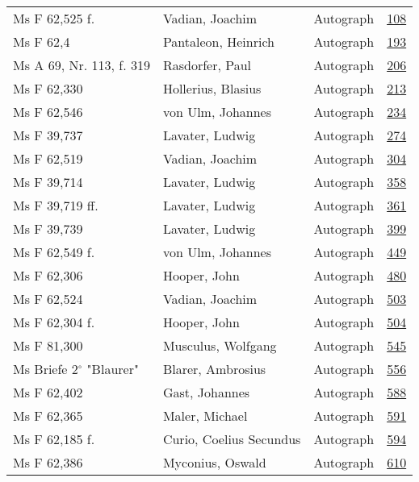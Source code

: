 \documentclass[10pt,a4paper,landscape]{report}
\begin{document}
\begin{longtable}{p{16cm}p{4cm}lr}
Ms F 62,525 f.	&	Vadian, Joachim	&	Autograph	&	\href{http://130.60.24.72/assignment/108}{108}\\
Ms F 62,4	&	Pantaleon, Heinrich	&	Autograph	&	\href{http://130.60.24.72/assignment/193}{193}\\
Ms A 69, Nr. 113, f. 319	&	Rasdorfer, Paul	&	Autograph	&	\href{http://130.60.24.72/assignment/206}{206}\\
Ms F 62,330	&	Hollerius, Blasius	&	Autograph	&	\href{http://130.60.24.72/assignment/213}{213}\\
Ms F 62,546	&	von Ulm, Johannes	&	Autograph	&	\href{http://130.60.24.72/assignment/234}{234}\\
Ms F 39,737	&	Lavater, Ludwig	&	Autograph	&	\href{http://130.60.24.72/assignment/274}{274}\\
Ms F 62,519	&	Vadian, Joachim	&	Autograph	&	\href{http://130.60.24.72/assignment/304}{304}\\
Ms F 39,714	&	Lavater, Ludwig	&	Autograph	&	\href{http://130.60.24.72/assignment/358}{358}\\
Ms F 39,719 ff.	&	Lavater, Ludwig	&	Autograph	&	\href{http://130.60.24.72/assignment/361}{361}\\
Ms F 39,739	&	Lavater, Ludwig	&	Autograph	&	\href{http://130.60.24.72/assignment/399}{399}\\
Ms F 62,549 f.	&	von Ulm, Johannes	&	Autograph	&	\href{http://130.60.24.72/assignment/449}{449}\\
Ms F 62,306	&	Hooper, John	&	Autograph	&	\href{http://130.60.24.72/assignment/480}{480}\\
Ms F 62,524	&	Vadian, Joachim	&	Autograph	&	\href{http://130.60.24.72/assignment/503}{503}\\
Ms F 62,304 f.	&	Hooper, John	&	Autograph	&	\href{http://130.60.24.72/assignment/504}{504}\\
Ms F 81,300	&	Musculus, Wolfgang	&	Autograph	&	\href{http://130.60.24.72/assignment/545}{545}\\
Ms Briefe 2$^\circ$ "Blaurer"	&	Blarer, Ambrosius	&	Autograph	&	\href{http://130.60.24.72/assignment/556}{556}\\
Ms F 62,402	&	Gast, Johannes	&	Autograph	&	\href{http://130.60.24.72/assignment/588}{588}\\
Ms F 62,365	&	Maler, Michael	&	Autograph	&	\href{http://130.60.24.72/assignment/591}{591}\\
Ms F 62,185 f.	&	Curio, Coelius Secundus	&	Autograph	&	\href{http://130.60.24.72/assignment/594}{594}\\
Ms F 62,386	&	Myconius, Oswald	&	Autograph	&	\href{http://130.60.24.72/assignment/610}{610}\\

\end{longtable}
\end{document}

